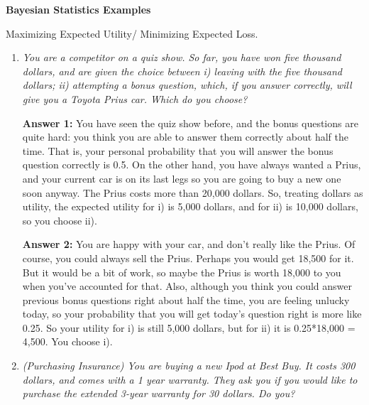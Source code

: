 \def\P{\mbox{P}}
\def\G{\Gamma}
\def\t{\theta}
\def\a{\alpha}
\def\E{\mbox{E}}
\parindent=0in
\pagestyle{empty}



\begin{center}
{\bf
Bayesian Statistics Examples

\smallskip

Maximizing Expected Utility/ Minimizing Expected Loss.
}
\smallskip

\end{center}

\bigskip
\begin{enumerate}
\item {\it You are a competitor on a quiz show. So far, you have won five thousand dollars, and are given the choice between i) leaving with the five thousand dollars; ii) attempting a bonus question, which, if you answer correctly, will give you a Toyota Prius car. Which do you choose?}

{\bf Answer 1:} You have seen the quiz show before, and the bonus questions are quite hard: you think
you are able to answer them correctly about half the time. That is, your personal probability that
you will answer the bonus question correctly is 0.5. On the other hand, you have always wanted
a Prius, and your current car is on its last legs so you are going to buy a new one soon
anyway. The Prius costs more than 20,000 dollars. So, treating dollars as utility, the expected utility
for i) is 5,000 dollars, and for ii) is 10,000 dollars, so you choose ii).

{\bf Answer 2:} You are happy with your car, and don't really like the Prius. Of course, you could always
sell the Prius. Perhaps you would get 18,500 for it. But it would be a bit of work, so maybe
the Prius is worth 18,000 to you when you've accounted for that. Also,
although you think you could answer previous bonus questions right about half the time, you
are feeling unlucky today, so your probability that you will get today's question right is more like 0.25.
So your utility for i) is still 5,000 dollars, but for ii) it is 0.25*18,000 = 4,500. You choose i).

\medskip

\item {\it (Purchasing Insurance) You are buying a new Ipod at Best Buy. It costs 300 dollars,
and comes with a 1 year warranty.
They ask you if you would like to purchase the extended 3-year warranty for 30 dollars. Do you?}


\end{enumerate}
